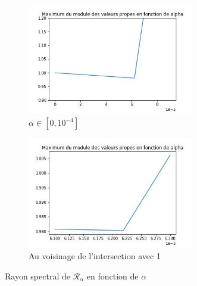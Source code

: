 \documentclass[12pt]{report}
\begin{document}
\begin{figure}
    \centering
    \begin{subfigure}[b]{0.4\textwidth}
        \centering
        \includegraphics[width=0.8\textwidth, height=0.8\textwidth]{choix_alpha_1D.jpg}
        \caption{$\alpha \in [0, 10^{-4}]$}
    \end{subfigure}
    \hfill
    \begin{subfigure}[b]{0.4\textwidth}
        \centering
        \includegraphics[width=0.8\textwidth, height=0.8\textwidth]{choix_alpha_1D_zoom.jpg}
        \caption{Au voisinage de l'intersection avec 1}
    \end{subfigure}
       \caption{Rayon spectral de $\mathcal{R}_\alpha$ en fonction de $\alpha$}
       \label{fig:choix alpha 1D}
\end{figure}
\end{document}
